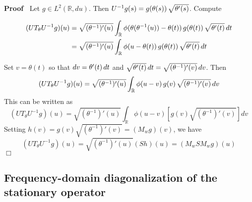 \documentclass{article}
\newenvironment{proof}{\noindent\textbf{Proof\ }}{\hspace*{\fill}$\Box$\medskip}
{\theorembodyfont{\rmfamily}\newtheorem{example}{Example}}
\begin{document}
\begin{proof}
  Let $g \in L^2 (\mathbb{R}, du)$. Then $U^{- 1} g (s) = g (\theta (s))
  \hspace{0.17em} \sqrt{\theta' (s)}$. Compute
  
  \begin{align}
    (UT_{\theta} U^{- 1} g) (u) & = \sqrt{(\theta^{- 1})' (u)} 
    \int_{\mathbb{R}} \phi (\theta (\theta^{- 1} (u)) - \theta (t)) 
    \hspace{0.17em} g (\theta (t)) \hspace{0.17em} \sqrt{\theta' (t)} 
    \hspace{0.17em} dt \\
    & = \sqrt{(\theta^{- 1})' (u)}  \int_{\mathbb{R}} \phi (u - \theta (t)) 
    \hspace{0.17em} g (\theta (t)) \hspace{0.17em} \sqrt{\theta' (t)} 
    \hspace{0.17em} dt 
  \end{align}
  
  Set $v = \theta (t)$ so that $dv = \theta' (t)  \hspace{0.17em} dt$ and
  $\sqrt{\theta' (t)}  \hspace{0.17em} dt = \sqrt{(\theta^{- 1})' (v)} 
  \hspace{0.17em} dv$. Then
  \begin{equation}
    (UT_{\theta} U^{- 1} g) (u) = \sqrt{(\theta^{- 1})' (u)} 
    \int_{\mathbb{R}} \phi (u - v)  \hspace{0.17em} g (v) \hspace{0.17em}
    \sqrt{(\theta^{- 1})' (v)}  \hspace{0.17em} dv
  \end{equation}
  This can be written as
  \begin{equation}
    (UT_{\theta} U^{- 1} g) (u) = \sqrt{(\theta^{- 1})' (u)} 
    \int_{\mathbb{R}} \phi (u - v) [g (v) \sqrt{(\theta^{- 1})' (v)}] dv
  \end{equation}
  Setting $h (v) = g (v) \sqrt{(\theta^{- 1})' (v)} = (M_w g) (v)$, we have
  \begin{equation}
    (UT_{\theta} U^{- 1} g) (u) = \sqrt{(\theta^{- 1})' (u)}  (Sh) (u) = (M_w
    SM_w g) (u)
  \end{equation}
\end{proof}

\subsection{Frequency-domain diagonalization of the stationary operator}
\end{document}
